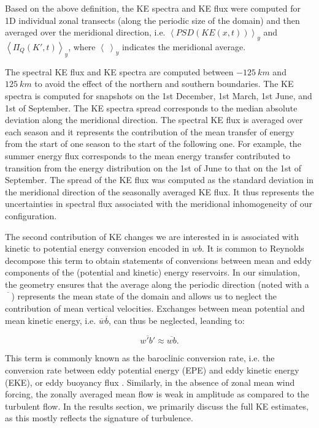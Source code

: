 \documentclass[draft]{agujournal2019}
\begin{document}
Based on the above definition, the KE spectra and KE flux were computed for 1D individual zonal transects (along the periodic size of the domain) and then averaged over the meridional direction, i.e. $\left<PSD(KE(x,t))\right>_y$ and $\left<\Pi_Q (K', t) \right>_y$, where $\left<\ \right>_y$ indicates the meridional average.

The spectral KE flux and KE spectra are computed between $-125\ km$ and $125\ km$ to avoid the effect of the northern and southern boundaries. The KE spectra is computed for snapshots on the 1st December, 1st March, 1st June, and 1st of September. The KE spectra spread corresponds to the median absolute deviation along the meridional direction. The spectral KE flux is averaged over each season and it represents the contribution of the mean transfer of energy from the start of one season to the start of the following one. For example, the summer energy flux corresponds to the mean energy transfer contributed to transition from the energy distribution on the 1st of June to that on the 1st of September. The spread of the KE flux was computed as the standard deviation in the meridional direction of the seasonally averaged KE flux. It thus represents the uncertainties in spectral flux associated with the meridional inhomogeneity of our configuration.

The second contribution of KE changes we are interested in is associated with kinetic to potential energy conversion encoded in $wb$.
It is common to Reynolds decompose this term to obtain statements of conversions between mean and eddy components of the (potential and kinetic) energy reservoirs. 
In our simulation, the geometry ensures that the average along the periodic direction (noted with a $\overline{\phantom{A}}$) represents the mean state of the domain and allows us to neglect the contribution of mean vertical velocities. Exchanges between mean potential and mean kinetic energy, i.e. $\overline{w}\overline{b}$, can thus be neglected, leanding to:
\begin{linenomath*}
\begin{equation}
  \overline{w'b'} \approx \overline{wb}.
  \label{eq:eq4}
\end{equation}
\end{linenomath*}

This term is commonly known as the baroclinic conversion rate, i.e. the conversion rate between eddy potential energy (EPE) and eddy kinetic energy (EKE), or eddy buoyancy flux \citep{Wunsch_vertical_2004}. Similarly, in the absence of zonal mean wind forcing, the zonally averaged mean flow is weak in amplitude as compared to the turbulent flow. In the results section, we primarily discuss the full KE estimates, as this mostly reflects the signature of turbulence.
\end{document}
